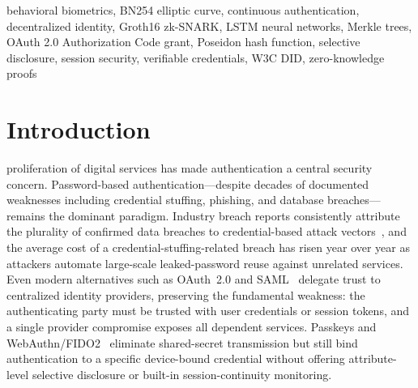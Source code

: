 \documentclass[journal,twoside,10pt]{IEEEtran}
\begin{document}
\begin{abstract}
(108{,}111 windows), achieves AUC-ROC 0.816 with a 6.15\% false-accept rate.
We further provide formal security proofs for soundness, zero-knowledge,
and nullifier replay resistance, a quantitative comparison against seven
existing authentication paradigms---including pure OAuth~2.0/OIDC without a
ZKP-backed authenticator---and a scalability analysis showing $K$-linear
horizontal throughput scaling compatible with national-identity-scale
deployments such as India's DigiLocker (434.9~million users). These results
establish that pairing OAuth~2.0 delegation with a ZKP-based authentication
primitive is not merely privacy-preserving in theory but practically
deployable at production latency across the full range of client hardware,
with direct implications for cloud security, decentralized identity, and
regulatory compliance under India's DPDP Act 2023 and the EU GDPR.
\end{abstract}

\begin{IEEEkeywords}
behavioral biometrics, BN254 elliptic curve, continuous authentication,
decentralized identity, Groth16 zk-SNARK, LSTM neural networks, Merkle trees,
OAuth 2.0 Authorization Code grant, Poseidon hash function, selective
disclosure, session security, verifiable credentials, W3C DID,
zero-knowledge proofs
\end{IEEEkeywords}

\section{Introduction}

 proliferation of digital services has made authentication
a central security concern. Password-based authentication---despite decades of
documented weaknesses including credential stuffing, phishing, and database
breaches---remains the dominant paradigm. Industry breach reports consistently
attribute the plurality of confirmed data breaches to credential-based attack
vectors~\cite{dbir}, and the average cost of a credential-stuffing-related breach has
risen year over year as attackers automate large-scale leaked-password reuse
against unrelated services. Even modern alternatives such as OAuth~2.0 and
SAML~\cite{saml} delegate trust to centralized identity providers, preserving the
fundamental weakness: the authenticating party must be trusted with user
credentials or session tokens, and a single provider compromise exposes all
dependent services. Passkeys and WebAuthn/FIDO2~\cite{fido2} eliminate
shared-secret transmission but still bind authentication to a specific
device-bound credential without offering attribute-level selective
disclosure or built-in session-continuity monitoring.
\end{document}
